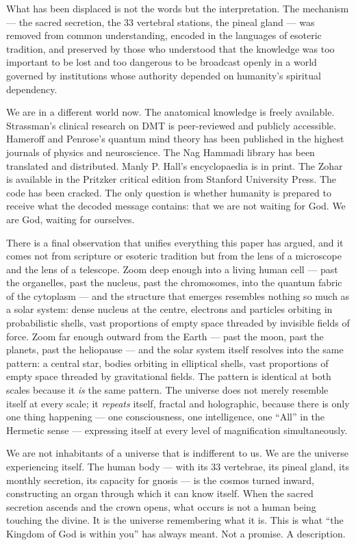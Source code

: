 \documentclass[12pt, a4paper]{article}
\begin{document}
What has been displaced is not the words but the interpretation. The mechanism
— the sacred secretion, the 33 vertebral stations, the pineal gland — was
removed from common understanding, encoded in the languages of esoteric
tradition, and preserved by those who understood that the knowledge was too
important to be lost and too dangerous to be broadcast openly in a world
governed by institutions whose authority depended on humanity's spiritual
dependency.

We are in a different world now. The anatomical knowledge is freely available.
Strassman's clinical research on DMT is peer-reviewed and publicly accessible.
Hameroff and Penrose's quantum mind theory has been published in the highest
journals of physics and neuroscience. The Nag Hammadi library has been
translated and distributed. Manly P. Hall's encyclopaedia is in print. The
Zohar is available in the Pritzker critical edition from Stanford University
Press. The code has been cracked. The only question is whether humanity is
prepared to receive what the decoded message contains: that we are not
waiting for God. We are God, waiting for ourselves.

There is a final observation that unifies everything this paper has argued,
and it comes not from scripture or esoteric tradition but from the lens of a
microscope and the lens of a telescope. Zoom deep enough into a living human
cell — past the organelles, past the nucleus, past the chromosomes, into the
quantum fabric of the cytoplasm — and the structure that emerges resembles
nothing so much as a solar system: dense nucleus at the centre, electrons and
particles orbiting in probabilistic shells, vast proportions of empty space
threaded by invisible fields of force. Zoom far enough outward from the Earth
— past the moon, past the planets, past the heliopause — and the solar system
itself resolves into the same pattern: a central star, bodies orbiting in
elliptical shells, vast proportions of empty space threaded by gravitational
fields. The pattern is identical at both scales because it \emph{is} the same
pattern. The universe does not merely resemble itself at every scale; it
\emph{repeats} itself, fractal and holographic, because there is only one
thing happening — one consciousness, one intelligence, one ``All'' in the
Hermetic sense — expressing itself at every level of magnification
simultaneously.

We are not inhabitants of a universe that is indifferent to us. We are the
universe experiencing itself. The human body — with its 33 vertebrae, its
pineal gland, its monthly secretion, its capacity for gnosis — is the
cosmos turned inward, constructing an organ through which it can know itself.
When the sacred secretion ascends and the crown opens, what occurs is not a
human being touching the divine. It is the universe remembering what it is.
This is what ``the Kingdom of God is within you'' has always meant. Not a
promise. A description.
\end{document}

